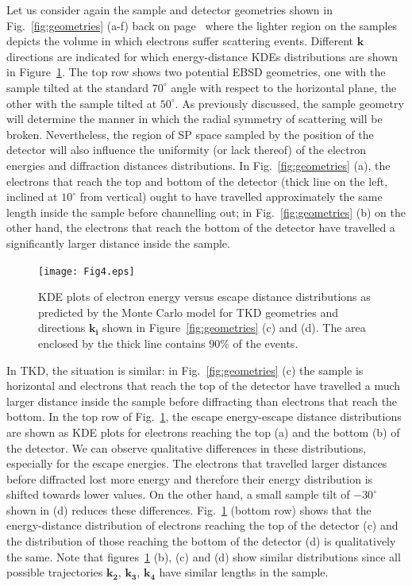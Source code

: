 Let us consider again the sample and detector geometries shown in Fig.~\ref{fig:geometries} (a-f) back on page~\pageref{fig:geometries} where the lighter region on the samples depicts the volume in which electrons suffer scattering events.  Different $\mathbf{k}$ directions are indicated for which energy-distance KDEs distributions are shown in Figure~\ref{fig:ks}.  The top row shows two potential EBSD geometries, one with the sample tilted at the standard $70^{\circ}$ angle with respect to the horizontal plane, the other with the sample tilted at $50^{\circ}$. As previously discussed, the sample geometry will determine the manner in which the radial symmetry of scattering will be broken. Nevertheless, the region of SP space sampled by the position of the detector will also influence the uniformity (or lack thereof) of the electron energies and diffraction distances distributions. In Fig.~\ref{fig:geometries} (a), the electrons that reach the top and bottom of the detector (thick line on the left, inclined at $10^{\circ}$ from vertical) ought to have travelled approximately the same length inside the sample before channelling out; in Fig.~\ref{fig:geometries} (b) on the other hand, the electrons that reach the bottom of the detector have travelled a significantly larger distance inside the sample. 

\begin{figure}[ht]
\centering\leavevmode
\texttt{[image: Fig4.eps]}%
\caption[KDE plots of electron energy versus escape distance distributions]{KDE plots of electron energy versus escape distance distributions as predicted by the Monte Carlo model for TKD geometries and directions $\mathbf{k_i}$ shown in Figure~\ref{fig:geometries} (c) and (d). The area enclosed by the thick line contains 90$\%$ of the events.}
\label{fig:ks}
\end{figure}

In TKD, the situation is similar: in Fig.~\ref{fig:geometries} (c) the sample is horizontal and electrons that reach the top of the detector have travelled a much larger distance inside the sample before diffracting than electrons that reach the bottom. In the top row of Fig.~\ref{fig:ks}, the escape energy-escape distance distributions are shown as KDE plots for electrons reaching the top (a) and the bottom (b) of the detector. We can observe qualitative differences in these distributions, especially for the escape energies. The electrons that travelled larger distances before diffracted lost more energy and therefore their energy distribution is shifted towards lower values. On the other hand, a small sample tilt of $-30^{\circ}$ shown in (d) reduces these differences. Fig.~\ref{fig:ks} (bottom row) shows that the energy-distance distribution of electrons reaching the top of the detector (c) and the distribution of those reaching the bottom of the detector (d) is qualitatively the same. Note that figures~\ref{fig:ks} (b), (c) and (d) show similar distributions since all possible trajectories $\mathbf{k_2}$, $\mathbf{k_3}$, $\mathbf{k_4}$ have similar lengths in the sample.

